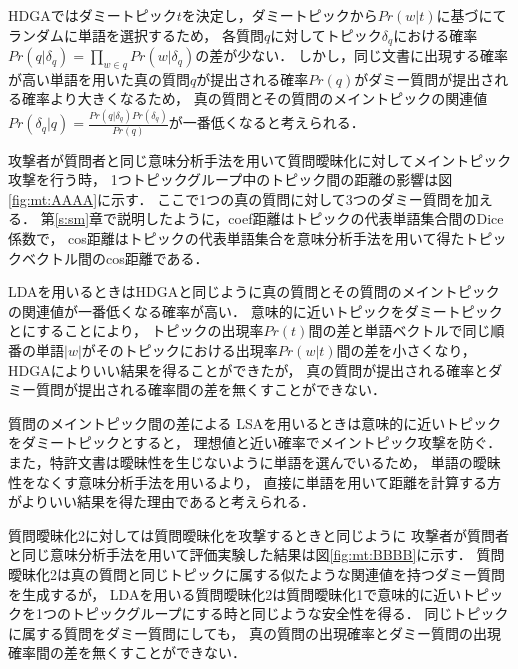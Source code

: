 \documentclass[master]{suribt}
\theoremstyle{definition}
\begin{document}
 HDGAではダミートピック$t$を決定し，ダミートピックから$Pr(w|t)$に基づにてランダムに単語を選択するため，
 各質問$q$に対してトピック$\delta_q$における確率$Pr(q|\delta_q) = \prod_{w \in q}Pr(w|\delta_q)$の差が少ない．
 しかし，同じ文書に出現する確率が高い単語を用いた真の質問$q$が提出される確率$Pr(q)$がダミー質問が提出される確率より大きくなるため，
 真の質問とその質問のメイントピックの関連値$Pr(\delta_q|q)=\frac{Pr(q|\delta_q)Pr(\delta_q)}{Pr(q)}$が一番低くなると考えられる．

 攻撃者が質問者と同じ意味分析手法を用いて質問曖昧化に対してメイントピック攻撃を行う時，
 1つトピックグループ中のトピック間の距離の影響は図\ref{fig:mt:AAAA}に示す．
 ここで1つの真の質問に対して3つのダミー質問を加える．
 第\ref{s:sm}章で説明したように，coef距離はトピックの代表単語集合間のDice係数で，
 cos距離はトピックの代表単語集合を意味分析手法を用いて得たトピックベクトル間のcos距離である．

 LDAを用いるときはHDGAと同じように真の質問とその質問のメイントピックの関連値が一番低くなる確率が高い．
 意味的に近いトピックをダミートピックとにすることにより，
 トピックの出現率$Pr(t)$間の差と単語ベクトルで同じ順番の単語$|w|$がそのトピックにおける出現率$Pr(w|t)$間の差を小さくなり，
 HDGAによりいい結果を得ることができたが，
 真の質問が提出される確率とダミー質問が提出される確率間の差を無くすことができない．
 
 質問のメイントピック間の差による
 LSAを用いるときは意味的に近いトピックをダミートピックとすると，
 理想値と近い確率でメイントピック攻撃を防ぐ．
 また，特許文書は曖昧性を生じないように単語を選んでいるため，
 単語の曖昧性をなくす意味分析手法を用いるより，
 直接に単語を用いて距離を計算する方がよりいい結果を得た理由であると考えられる．

 
 質問曖昧化2に対しては質問曖昧化を攻撃するときと同じように
 攻撃者が質問者と同じ意味分析手法を用いて評価実験した結果は図\ref{fig:mt:BBBB}に示す．
 質問曖昧化2は真の質問と同じトピックに属する似たような関連値を持つダミー質問を生成するが，
 LDAを用いる質問曖昧化2は質問曖昧化1で意味的に近いトピックを1つのトピックグループにする時と同じような安全性を得る．
 同じトピックに属する質問をダミー質問にしても，
 真の質問の出現確率とダミー質問の出現確率間の差を無くすことができない．
\end{document}
